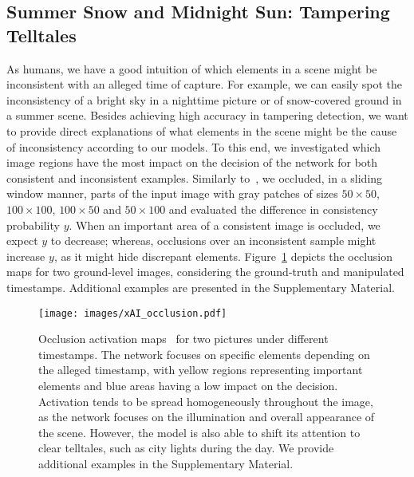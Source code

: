 \documentclass[journal]{IEEEtran}
\begin{document}
        
        
        






    \subsection{Summer Snow and Midnight Sun: Tampering Telltales}\label{sec:xai}
        As humans, we have a good intuition of which elements in a scene might be inconsistent with an alleged time of capture. For example, we can easily spot the inconsistency of a bright sky in a nighttime picture or of snow-covered ground in a summer scene. Besides achieving high accuracy in tampering detection, we want to provide direct explanations of what elements in the scene might be the cause of inconsistency according to our models.  
        To this end, we investigated which image regions have the most impact on the decision of the network for both consistent and inconsistent examples. Similarly to~\cite{zeiler2014visualizing}, we occluded, in a sliding window manner, parts of the input image with gray patches of sizes $50\times50$, $100\times100$, $100\times50$ and $50\times100$ and evaluated the difference in consistency probability $y$. When an important area of a consistent image is occluded, we expect $y$ to decrease; whereas, occlusions over an inconsistent sample might increase $y$, as it might hide discrepant elements. Figure~\ref{fig:xai_occlusion} depicts the occlusion maps for two ground-level images, considering the ground-truth and manipulated timestamps. Additional examples are presented in the Supplementary Material.
        
        \begin{figure}[!t]
            \centering
            \texttt{[image: images/xAI\_occlusion.pdf]}
            \caption{Occlusion activation maps~\cite{zeiler2014visualizing} for two pictures under different timestamps. The network focuses on specific elements depending on the alleged timestamp, with yellow regions representing important elements and blue areas having a low impact on the decision. Activation tends to be spread homogeneously throughout the image, as the network focuses on the illumination and overall appearance of the scene. However, the model is also able to shift its attention to clear telltales, such as city lights during the day. We provide additional examples in the Supplementary Material.}
            \label{fig:xai_occlusion}
        \end{figure}
        
\end{document}
